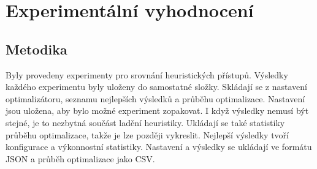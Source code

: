 \chapter{Experimentální vyhodnocení}

\section{Metodika}
Byly provedeny experimenty pro srovnání heuristických přístupů.
Výsledky každého experimentu byly uloženy do samostatné složky.
Skládají se z nastavení optimalizátoru, seznamu nejlepších výsledků a průběhu optimalizace.
Nastavení jsou uložena, aby bylo možné experiment zopakovat.
I když výsledky nemusí být stejné, je to nezbytná součást ladění heuristiky.
Ukládají se také statistiky průběhu optimalizace, takže je lze později vykreslit.
Nejlepší výsledky tvoří konfigurace a výkonnostní statistiky.
Nastavení a výsledky se ukládají ve formátu JSON a průběh optimalizace jako CSV.